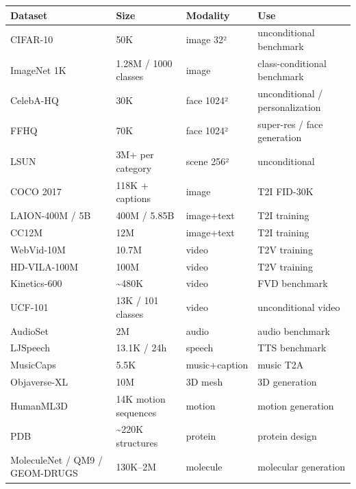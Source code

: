 {\def\LTcaptype{none} %
\begin{longtable}[]{@{}
  >{\raggedright\arraybackslash}p{}
  >{\raggedright\arraybackslash}p{}
  >{\raggedright\arraybackslash}p{}
  >{\raggedright\arraybackslash}p{}@{}}
\toprule\noalign{}
\begin{minipage}[b]{\linewidth}\raggedright
Dataset
\end{minipage} & \begin{minipage}[b]{\linewidth}\raggedright
Size
\end{minipage} & \begin{minipage}[b]{\linewidth}\raggedright
Modality
\end{minipage} & \begin{minipage}[b]{\linewidth}\raggedright
Use
\end{minipage} \\
\midrule\noalign{}
\endhead
\bottomrule\noalign{}
\endlastfoot
CIFAR-10 & 50K & image 32² & unconditional benchmark \\
ImageNet 1K & 1.28M / 1000 classes & image & class-conditional benchmark \\
CelebA-HQ & 30K & face 1024² & unconditional / personalization \\
FFHQ & 70K & face 1024² & super-res / face generation \\
LSUN & 3M+ per category & scene 256² & unconditional \\
COCO 2017 & 118K + captions & image & T2I FID-30K \\
LAION-400M / 5B & 400M / 5.85B & image+text & T2I training \\
CC12M & 12M & image+text & T2I training \\
WebVid-10M & 10.7M & video & T2V training \\
HD-VILA-100M & 100M & video & T2V training \\
Kinetics-600 & \textasciitilde480K & video & FVD benchmark \\
UCF-101 & 13K / 101 classes & video & unconditional video \\
AudioSet & 2M & audio & audio benchmark \\
LJSpeech & 13.1K / 24h & speech & TTS benchmark \\
MusicCaps & 5.5K & music+caption & music T2A \\
Objaverse-XL & 10M & 3D mesh & 3D generation \\
HumanML3D & 14K motion sequences & motion & motion generation \\
PDB & \textasciitilde220K structures & protein & protein design \\
MoleculeNet / QM9 / GEOM-DRUGS & 130K--2M & molecule & molecular generation \\
\end{longtable}
}

